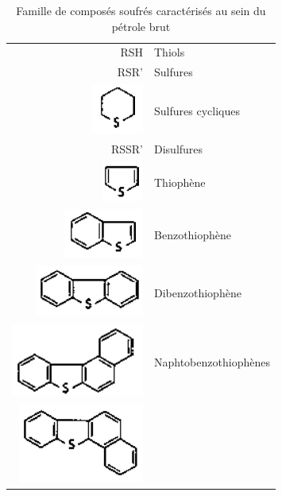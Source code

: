 \begin{table}[h!]
	\begin{center}
		\begin{tabular}{rl}
			\hline
			RSH & Thiols \\
			RSR' & Sulfures \\
			\includegraphics[scale=0.7]{image/sulfure-cyclique} & Sulfures cycliques \\
			RSSR' & Disulfures \\
			 \includegraphics[scale=0.7]{image/thiophene} & Thiophène \\
			\includegraphics[scale=0.7]{image/benzothiophene} & Benzothiophène \\
			\includegraphics[scale=0.7]{image/dibenzothiophene} & Dibenzothiophène \\
			\includegraphics[scale=0.7]{image/naphtobenzothiophene1} & Naphtobenzothiophènes \\
			\includegraphics[scale=0.7]{image/naphtobenzothiophene2} & \\
			\hline 
		\end{tabular}
	\end{center}
	\caption{Famille de composés soufrés caractérisés au sein du pétrole brut}
	\label{tab:soufre}
\end{table}


